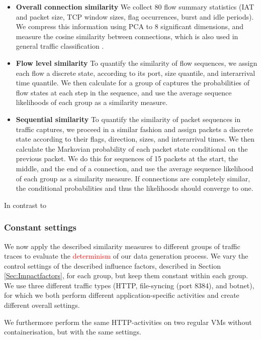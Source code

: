 \documentclass{article}
\begin{document}
\begin{itemize}
\item \textbf{Overall connection similarity} We collect 80 flow summary statistics (IAT and packet size, TCP window sizes, flag occurrences, burst and idle periods). We compress this information using PCA to 8 significant dimensions, and measure the cosine similarity between connections, which is also used in general traffic classification \cite{aun2017review}.
\item \textbf{Flow level similarity} To quantify the similarity of flow sequences, we assign each flow a discrete state, according to its port, size quantile, and interarrival time quantile. We then calculate for a group of captures the probabilities of flow states at each step in the sequence, and use the average sequence likelihoods of each group as a similarity measure. 
\item \textbf{Sequential similarity} To quantify the similarity of packet sequences in traffic captures, we proceed in a similar fashion and assign packets a discrete state according to their flags, direction, sizes, and interarrival times. We then calculate the Markovian probability of each packet state conditional on the previous packet. We do this for sequences of 15 packets at the start, the middle, and the end of a connection, and use the average sequence likelihood of each group as a similarity measure. If connections are completely similar, the conditional probabilities and thus the likelihoods should converge to one.
\end{itemize}

In contrast to 


\subsubsection{Constant settings}

We now apply the described similarity measures to different groups of traffic traces to evaluate the \textcolor{red}{determinism} of our data generation process. We vary the control settings of the described influence factors, described in Section \ref{Sec:Impactfactors}, for each group, but keep them constant within each group. We use three different traffic types (HTTP, file-syncing (port 8384), and botnet), for which we both perform different application-specific activities and create different overall settings. 

We furthermore perform the same HTTP-activities on two regular VMs without containerisation, but with the same settings.
\end{document}
